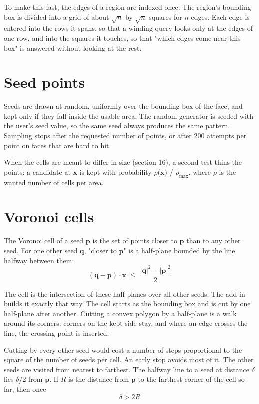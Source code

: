 \documentclass[11pt,a4paper]{article}
\begin{document}
To make this fast, the edges of a region are indexed once. The region's bounding box is divided into a grid of about $\surd n$ by $\surd n$ squares for $n$ edges. Each edge is entered into the rows it spans, so that a winding query looks only at the edges of one row, and into the squares it touches, so that "which edges come near this box" is answered without looking at the rest. 

\section{Seed points}
 

Seeds are drawn at random, uniformly over the bounding box of the face, and kept only if they fall inside the usable area. The random generator is seeded with the user's seed value, so the same seed always produces the same pattern. Sampling stops after the requested number of points, or after 200 attempts per point on faces that are hard to hit. 

When the cells are meant to differ in size (section 16), a second test thins the points: a candidate at $\mathbf{x}$ is kept with probability $\rho $($\mathbf{x}$) / $\rho _{\mathrm{max}}$, where $\rho $ is the wanted number of cells per area. 

\section{Voronoi cells}
 

The Voronoi cell of a seed $\mathbf{p}$ is the set of points closer to $\mathbf{p}$ than to any other seed. For one other seed $\mathbf{q}$, "closer to $\mathbf{p}$" is a half-plane bounded by the line halfway between them: 
\begin{equation}
(\mathbf{q} - \mathbf{p})\cdot\mathbf{x} \;\le\; \frac{|\mathbf{q}|^2 - |\mathbf{p}|^2}{2}
\end{equation}
 

The cell is the intersection of these half-planes over all other seeds. The add-in builds it exactly that way. The cell starts as the bounding box and is cut by one half-plane after another. Cutting a convex polygon by a half-plane is a walk around its corners: corners on the kept side stay, and where an edge crosses the line, the crossing point is inserted. 

Cutting by every other seed would cost a number of steps proportional to the square of the number of seeds per cell. An early stop avoids most of it. The other seeds are visited from nearest to farthest. The halfway line to a seed at distance $\delta $ lies $\delta $/2 from $\mathbf{p}$. If $R$ is the distance from $\mathbf{p}$ to the farthest corner of the cell so far, then once 
\begin{equation}
\delta > 2R
\end{equation}
 
\end{document}
